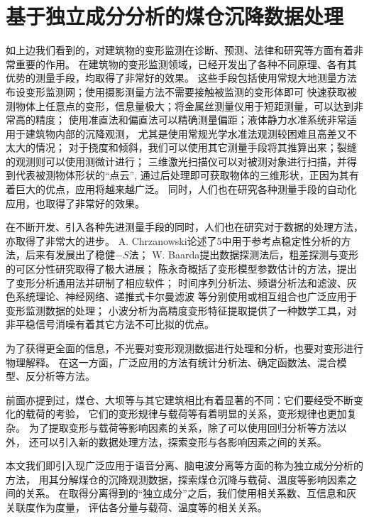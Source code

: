 	
\section{基于独立成分分析的煤仓沉降数据处理}
如上边我们看到的，对建筑物的变形监测在诊断、预测、法律和研究等方面有着非常重要的作用。
在建筑物的变形监测领域，已经开发出了各种不同原理、各有其优势的测量手段，均取得了非常好的效果。
这些手段包括使用常规大地测量方法布设变形监测网；使用摄影测量方法不需要接触被监测的变形体即可
快速获取被测物体上任意点的变形，信息量极大；将金属丝测量仪用于短距测量，可以达到非常高的精度；
使用准直法和偏直法可以精确测量偏距；液体静力水准系统非常适用于建筑物内部的沉降观测，
尤其是使用常规光学水准法观测较困难且高差又不太大的情况；
对于挠度和倾斜，我们可以使用其它测量手段将其推算出来；裂缝的观测则可以使用测微计进行；
三维激光扫描仪可以对被测对象进行扫描，并得到代表被测物体形状的“点云”,
通过后处理即可获取物体的三维形状，正因为其有着巨大的优点，应用将越来越广泛。
同时，人们也在研究各种测量手段的自动化应用，也取得了非常好的效果。

在不断开发、引入各种先进测量手段的同时，人们也在研究对于数据的处理方法，亦取得了非常大的进步。
A. Chrzanowski论述了5中用于参考点稳定性分析的方法，后来有发展出了稳健$-S$法；
W. Baarda提出数据探测法后，粗差探测与变形的可区分性研究取得了极大进展；
陈永奇概括了变形模型参数估计的方法，提出了变形分析通用法并研制了相应软件；
时间序列分析法、频谱分析法和滤波、灰色系统理论、神经网络、递推式卡尔曼滤波
等分别使用或相互组合也广泛应用于变形监测数据的处理；
小波分析为高精度变形特征提取提供了一种数学工具，对非平稳信号消噪有着其它方法不可比拟的优点。

为了获得更全面的信息，不光要对变形观测数据进行处理和分析，也要对变形进行物理解释。
在这一方面，广泛应用的方法有统计分析法、确定函数法、混合模型、反分析等方法。

前面亦提到过，煤仓、大坝等与其它建筑相比有着显著的不同：它们要经受不断变化的载荷的考验，
它们的变形规律与载荷等有着明显的关系，变形规律也更加复杂。
为了提取变形与载荷等影响因素的关系，除了可以使用回归分析等方法以外，
还可以引入新的数据处理方法，探索变形与各影响因素之间的关系。

本文我们即引入现广泛应用于语音分离、脑电波分离等方面的称为独立成分分析的方法，
用其分解煤仓的沉降观测数据，探索煤仓沉降与载荷、温度等影响因素之间的关系。
在取得分离得到的“独立成分”之后，我们使用相关系数、互信息和灰关联度作为度量，
评估各分量与载荷、温度等的相关关系。







